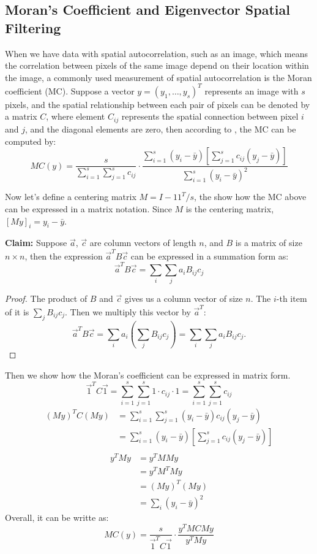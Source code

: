 \documentclass[12pt]{article}
\begin{document}
\subsection*{Moran's Coefficient and Eigenvector Spatial Filtering}

When we have data with spatial autocorrelation, such as an image, which means the correlation between pixels of the same image depend on their location within the image, a commonly used measurement of spatial autocorrelation is the Moran coefficient (MC). Suppose a vector \( y = (y_1, \ldots, y_s)^T \) represents an image with \( s \) pixels, and the spatial relationship between each pair of pixels can be denoted by a matrix \( C \), where element \( C_{ij} \) represents the spatial connection between pixel \( i \) and \( j \), and the diagonal elements are zero, then according to \citet{griffith2014spatial}, the MC can be computed by:
\[
M C(y) = \frac{s}{\sum_{i=1}^s \sum_{j=1}^s c_{ij}} \cdot \frac{\sum_{i=1}^s \left(y_i - \bar{y} \right) \left[ \sum_{j=1}^s c_{ij} \left( y_j - \bar{y} \right) \right]}{\sum_{i=1}^s \left( y_i - \bar{y} \right)^2}
\]

Now let's define a centering matrix \( M = I - 1 1^T / s \), the show how the MC above can be expressed in a matrix notation. Since \( M \) is the centering matrix, \( [M y]_i = y_i - \bar{y} \).

{\bf Claim:} Suppose \( \vec{a} \), \( \vec{c} \) are column vectors of length \( n \), and \( B \) is a matrix of size \( n \times n \),  then the expression \( \vec{a}^T B \vec{c} \) can be expressed in a summation form as:
\[
  \vec{a}^T B \vec{c} = \sum_i \sum_j a_i B_{ij} c_j
\]
\begin{proof}
  The product of \( B \) and \( \vec{c} \) gives us a column vector of size \( n \). The \( i \)-th item of it is \( \sum_j B_{ij} c_j \). Then we multiply this vector by \( \vec{a}^T \):
  \[
    \vec{a}^T B \vec{c} = \sum_i a_i \left( \sum_j B_{ij} c_j \right) = \sum_i \sum_j a_i B_{ij} c_j.
  \]
\end{proof}

Then we show how the Moran's coefficient can be expressed in matrix form.
\[
  \vec{1}^T C \vec{1} = \sum_{i=1}^s \sum_{j=1}^s 1 \cdot c_{i j} \cdot 1 = \sum_{i=1}^s \sum_{j=1}^s c_{i j} 
\]
\begin{align*}
  (M y)^T C (M y) & = \sum_{i=1}^s \sum_{j=1}^s (y_i - \bar{y}) c_{ij} (y_{j} - \bar{y}) \\
                  & = \sum_{i=1}^s(y_i-\bar{y})[\sum_{j=1}^s c_{i j}(y_j-\bar{y})]  \\
\end{align*}
\begin{align*}
  y^T M y & = y^T M M y \\
          & = y^T M^T M y \\
          & = (M y)^T (M y) \\
          & = \sum_i (y_i - \bar{y})^2
\end{align*}
Overall, it can be writte as:
\[
  M C(y) = \frac{s}{\vec{1}^T C \vec{1}} \cdot \frac{y^T M C M y}{y^T M y}
\]
\end{document}
